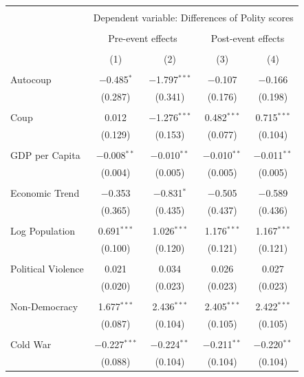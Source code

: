 \documentclass[
  12pt,
]{report}
\begin{document}
\begin{table}
{\begin{tabular}{@{\extracolsep{30pt}}lcccc} 
\\[-1.8ex]\hline 
\hline \\[-1.8ex] 
 & \multicolumn{4}{c}{Dependent variable: Differences of Polity scores} \\ 
\cline{2-5} 
\\[-1.8ex] & \multicolumn{2}{c}{Pre-event effects} & \multicolumn{2}{c}{Post-event effects} \\ 
\\[-1.8ex] & (1) & (2) & (3) & (4)\\ 
\hline \\[-1.8ex] 
 Autocoup & $-$0.485$^{*}$ & $-$1.797$^{***}$ & $-$0.107 & $-$0.166 \\ 
  & (0.287) & (0.341) & (0.176) & (0.198) \\ 
  & & & & \\ 
 Coup & 0.012 & $-$1.276$^{***}$ & 0.482$^{***}$ & 0.715$^{***}$ \\ 
  & (0.129) & (0.153) & (0.077) & (0.104) \\ 
  & & & & \\ 
 GDP per Capita & $-$0.008$^{**}$ & $-$0.010$^{**}$ & $-$0.010$^{**}$ & $-$0.011$^{**}$ \\ 
  & (0.004) & (0.005) & (0.005) & (0.005) \\ 
  & & & & \\ 
 Economic Trend & $-$0.353 & $-$0.831$^{*}$ & $-$0.505 & $-$0.589 \\ 
  & (0.365) & (0.435) & (0.437) & (0.436) \\ 
  & & & & \\ 
 Log Population & 0.691$^{***}$ & 1.026$^{***}$ & 1.176$^{***}$ & 1.167$^{***}$ \\ 
  & (0.100) & (0.120) & (0.121) & (0.121) \\ 
  & & & & \\ 
 Political Violence & 0.021 & 0.034 & 0.026 & 0.027 \\ 
  & (0.020) & (0.023) & (0.023) & (0.023) \\ 
  & & & & \\ 
 Non-Democracy & 1.677$^{***}$ & 2.436$^{***}$ & 2.405$^{***}$ & 2.422$^{***}$ \\ 
  & (0.087) & (0.104) & (0.105) & (0.105) \\ 
  & & & & \\ 
 Cold War & $-$0.227$^{***}$ & $-$0.224$^{**}$ & $-$0.211$^{**}$ & $-$0.220$^{**}$ \\ 
  & (0.088) & (0.104) & (0.104) & (0.104) \\ 

\end{tabular}}
\end{table}
\end{document}
